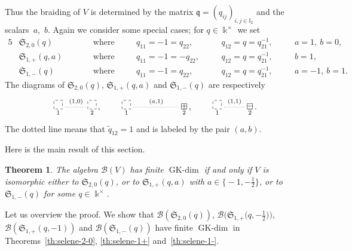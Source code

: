 \documentclass[pdftex]{sigma}
\numberwithin{equation}{section}
\newtheorem{Theorem}{Theorem}[section]
\newcommand{\GK}{\operatorname{GK-dim}}
\newcommand{\toba}{\mathscr B}
\newcommand{\sele}{\mathfrak{S}}
\newcommand{\I}{{\mathbb I}}
\newcommand{\bq}{\mathfrak{q}}
\begin{document}
Thus the braiding of $V$ is determined by the matrix $\bq = (q_{ij})_{i,j \in \I_{2}}$
and the scalars~$a$,~$b$.
Again we consider some special cases; for $q \in \Bbbk^{\times}$ we set
\begin{alignat}{5}\label{eq:selene-defi-20}
&\sele_{2,0}(q) &&\text{where} &&q_{11} = -1 = q_{22}, && q_{12} = q = q_{21}^{-1}, \quad&& a=1, \ b=0,
\\ \label{eq:selene-defi-1+}
&\sele_{1,+}(q, a) \qquad&&\text{where}\quad &&q_{11} = -1 =- q_{22}, \quad&& q_{12} = q = q_{21}^{-1}, && b=1,
\\ \label{eq:selene-defi-1-}
&\sele_{1,-}(q) &&\text{where} &&q_{11} = -1 = q_{22}, && q_{12} = q = q_{21}^{-1}, && a= -1, \ b=1.
\end{alignat}
The diagrams of $\sele_{2,0}(q)$, $\sele_{1,+}(q, a)$ and $\sele_{1,-}(q)$ are respectively
$$
\xymatrix{
\underset{1}{\begin{tikzpicture}
\draw[dashed] (0,0) rectangle (0.36,0.36);
\end{tikzpicture}} \ar@{.}^{(1,0)}[r]
&\underset{2}{\begin{tikzpicture}
\draw[dashed] (0,0) rectangle (0.36,0.36);
\end{tikzpicture}}\, ,}
\qquad
\xymatrix{
\underset{1}{\begin{tikzpicture}
\draw[dashed] (0,0) rectangle (0.36,0.36);
\end{tikzpicture}} \ar @{.}^{(a,1)}[rr]
& & \underset{2}{\boxplus}\,,}
\qquad
\xymatrix{
\underset{1}{\begin{tikzpicture}
\draw[dashed] (0,0) rectangle (0.36,0.36);
\end{tikzpicture}} \ar @{.}^{(1,1)}[r]
& \underset{2}{\boxminus}\,.}
$$
The dotted line means that
$\widetilde{q}_{12}=1$ and is labeled by the pair $(a,b)$.

Here is the main result of this section.

\begin{Theorem} \label{th:2-blocks}
The algebra $\toba (V)$ has finite $\GK$ if and only if $V$ is isomorphic
either to $\sele_{2,0}(q)$, or to $\sele_{1,+}(q, a)$ with $a \in \bigl\{-1, -\frac12\bigr\}$, or to $\sele_{1,-}(q)$ for some $q\in \Bbbk^{\times}$.
\end{Theorem}

Let us overview the proof.
We show that $\toba(\sele_{2,0}(q))$, $\toba\big(\sele_{1,+}\big(q,-\frac{1}{2}\big)\big)$, $\toba(\sele_{1,+}(q,-1))$ and $\toba(\sele_{1,-}(q))$
have finite $\GK$ in Theorems~\ref{th:selene-2-0}, \ref{th:selene-1+} and~\ref{th:selene-1-}.
\end{document}
